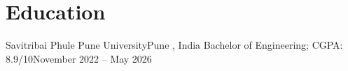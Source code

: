 \section{Education}
  \resumeSubHeadingListStart
    \resumeSubheading
      {Savitribai Phule Pune University}{Pune , India}
      {Bachelor of Engineering;  CGPA: 8.9/10}{November 2022 -- May 2026}
  \resumeSubHeadingListEnd